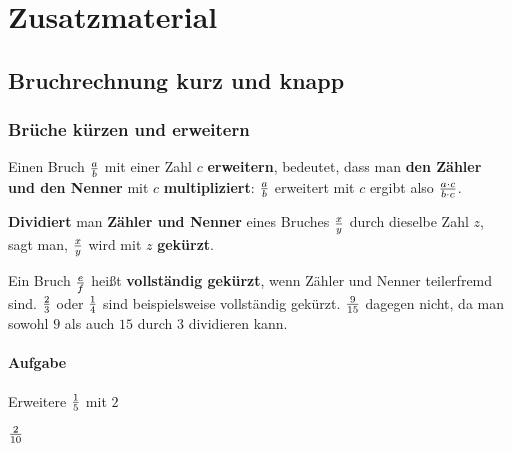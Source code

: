 \documentclass[
  ngerman,
]{book}
\begin{document}
\hypertarget{zusatzmaterial}{%
\chapter*{Zusatzmaterial}\label{zusatzmaterial}}

\hypertarget{bruchrechnung-kurz-und-knapp}{%
\section*{Bruchrechnung kurz und knapp}\label{bruchrechnung-kurz-und-knapp}}

\hypertarget{bruxfcche-kuxfcrzen-und-erweitern}{%
\subsection*{Brüche kürzen und erweitern}\label{bruxfcche-kuxfcrzen-und-erweitern}}

Einen Bruch \(a \over b\) mit einer Zahl \(c\) \textbf{erweitern}, bedeutet, dass man \textbf{den Zähler und den Nenner} mit \(c\) \textbf{multipliziert}: \(a \over b\) erweitert mit \(c\) ergibt also \(a \cdot c \over b \cdot c\).

\textbf{Dividiert} man \textbf{Zähler und Nenner} eines Bruches \(x \over y\) durch dieselbe Zahl \(z\), sagt man, \(x \over y\) wird mit \(z\) \textbf{gekürzt}.

Ein Bruch \(e \over f\) heißt \textbf{vollständig gekürzt}, wenn Zähler und Nenner teilerfremd sind. \(2 \over 3\) oder \(1 \over 4\) sind beispielsweise vollständig gekürzt. \(9 \over 15\) dagegen nicht, da man sowohl \(9\) als auch \(15\) durch \(3\) dividieren kann.

\hypertarget{section}{%
\subsubsection*{}\label{section}}

\hypertarget{aufgabe}{%
\subsubsection*{Aufgabe}\label{aufgabe}}

Erweitere \(1 \over 5\) mit \(2\)

\leavevmode\hypertarget{toggleText1}{}%
\(2 \over 10\)
\end{document}
